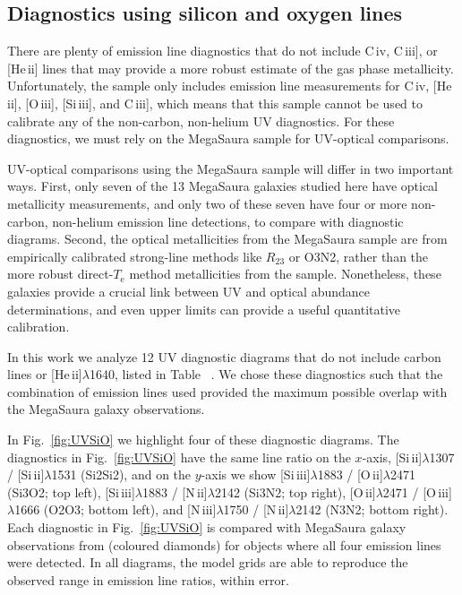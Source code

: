 \documentclass[preprint2]{aastex62}
\newcommand{\nii}{[N\,{\sc ii}]\xspace}
\newcommand{\niii}{[N\,{\sc iii}]\xspace}
\newcommand{\oiii}{[O\,{\sc iii}]\xspace}
\newcommand{\oii}{[O\,{\sc ii}]\xspace}
\newcommand{\heii}{[He\,{\sc ii}]\xspace}
\newcommand{\civ}{C\,{\sc iv}\xspace}
\newcommand{\SiuII}{[Si\,{\sc ii}]\xspace}
\newcommand{\SiuIII}{[Si\,{\sc iii}]\xspace}
\newcommand{\ciii}{C\,{\sc iii}]\xspace}
\newcommand{\mage}{{\sc Meg}a{\sc S}a{\sc ura}\xspace}
\newcommand{\Te}{\ensuremath{T_{\mathrm{e}}}\xspace}
\newcommand{\XXX}{{\bf \color{red}{XXX} }}
\begin{document}
\subsection{Diagnostics using silicon and oxygen lines}\label{sec:UVOpt:SiO}

There are plenty of emission line diagnostics that do not include \civ, \ciii, or \heii lines that may provide a more robust estimate of the gas phase metallicity. Unfortunately, the \citet{Berg+2016} sample only includes emission line measurements for \civ, \heii, \oiii, \SiuIII, and \ciii, which means that this sample cannot be used to calibrate any of the non-carbon, non-helium UV diagnostics. For these diagnostics, we must rely on the \mage sample for UV-optical comparisons. 

UV-optical comparisons using the \mage sample will differ in two important ways. First, only seven of the 13 \mage galaxies studied here have optical metallicity measurements, and only two of these seven have four or more non-carbon, non-helium emission line detections, to compare with diagnostic diagrams. Second, the optical metallicities from the \mage sample are from empirically calibrated strong-line methods like $R_{23}$ or O3N2, rather than the more robust direct-\Te method metallicities from the \citet{Berg+2016} sample. Nonetheless, these galaxies provide a crucial link between UV and optical abundance determinations, and even upper limits can provide a useful quantitative calibration.

In this work we analyze 12 UV diagnostic diagrams that do not include carbon lines or \heii$\lambda$1640, listed in Table~\XXX. We chose these diagnostics such that the combination of emission lines used provided the maximum possible overlap with the \mage galaxy observations.

In Fig.~\ref{fig:UVSiO} we highlight four of these diagnostic diagrams. The diagnostics in Fig.~\ref{fig:UVSiO} have the same line ratio on the $x$-axis, \SiuII$\lambda$1307 / \SiuII$\lambda$1531 (Si2Si2), and on the $y$-axis we show \SiuIII$\lambda$1883 / \oii$\lambda$2471  (Si3O2; top left), \SiuIII$\lambda$1883 / \nii$\lambda$2142 (Si3N2; top right), \oii$\lambda$2471 / \oiii$\lambda$1666 (O2O3; bottom left), and \niii$\lambda$1750 / \nii$\lambda$2142 (N3N2; bottom right). Each diagnostic in Fig.~\ref{fig:UVSiO} is compared with \mage galaxy observations from \citet{Rigby+2018b} (coloured diamonds) for objects where all four emission lines were detected. In all diagrams, the model grids are able to reproduce the observed range in emission line ratios, within error.
\end{document}
